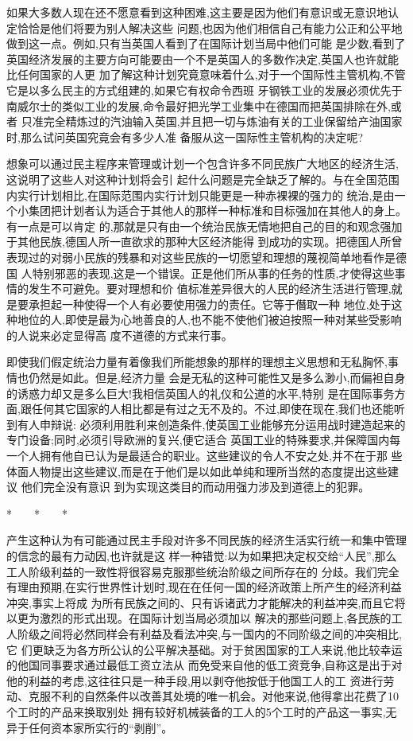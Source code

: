 ﻿\documentclass[12pt]{article}
\begin{document}
如果大多数人现在还不愿意看到这种困难,这主要是因为他们有意识或无意识地认定恰恰是他们将要为别人解决这些
问题,也因为他们相信自己有能力公正和公平地做到这一点。例如,只有当英国人看到了在国际计划当局中他们可能
是少数,看到了英国经济发展的主要方向可能要由一个不是英国人的多数作决定,英国人也许就能比任何国家的人更
加了解这种计划究竟意味着什么,对于一个国际性主管机构,不管它是以多么民主的方式组建的,如果它有权命令西班
牙钢铁工业的发展必须优先于南威尔士的类似工业的发展,命令最好把光学工业集中在德国而把英国排除在外,或者
只准完全精炼过的汽油输入英国,并且把一切与炼油有关的工业保留给产油国家时,那么试问英国究竟会有多少人准
备服从这一国际性主管机构的决定呢?

想象可以通过民主程序来管理或计划一个包含许多不同民族广大地区的经济生活,这说明了这些人对这种计划将会引
起什么问题是完全缺乏了解的。与在全国范围内实行计划相比,在国际范围内实行计划只能更是一种赤裸裸的强力的
统治,是由一个小集团把计划者认为适合于其他人的那样一种标准和目标强加在其他人的身上。有一点是可以肯定
的,那就是只有由一个统治民族无情地把自己的目的和观念强加于其他民族,德国人所一直欲求的那种大区经济能得
到成功的实现。把德国人所曾表现过的对弱小民族的残暴和对这些民族的一切愿望和理想的蔑视简单地看作是德国
人特别邪恶的表现,这是一个错误。正是他们所从事的任务的性质,才使得这些事情的发生不可避免。要对理想和价
值标准差异很大的人民的经济生活进行管理,就是要承担起一种使得一个人有必要使用强力的责任。它等于僭取一种
地位,处于这种地位的人,即使是最为心地善良的人,也不能不使他们被迫按照一种对某些受影响的人说来必定显得高
度不道德的方式来行事。

即使我们假定统治力量有着像我们所能想象的那样的理想主义思想和无私胸怀,事情也仍然是如此。但是,经济力量
会是无私的这种可能性又是多么渺小,而偏袒自身的诱惑力却又是多么巨大!我相信英国人的礼仪和公道的水平,特别
是在国际事务方面,跟任何其它国家的人相比都是有过之无不及的。不过,即使在现在,我们也还能听到有人申辩说:
必须利用胜利来创造条件,使英国工业能够充分运用战时建造起来的专门设备;同时,必须引导欧洲的复兴,便它适合
英国工业的特殊要求,并保障国内每一个人拥有他自已认为是最适合的职业。这些建议的令人不安之处,并不在于那
些体面人物提出这些建议,而是在于他们是以如此单纯和理所当然的态度提出这些建议 \myrule 他们完全没有意识
到为实现这类目的而动用强力涉及到道德上的犯罪。

*　　*　　*

产生这种认为有可能通过民主手段对许多不同民族的经济生活实行统一和集中管理的信念的最有力动因,也许就是这
样一种错觉:以为如果把决定权交给``人民'',那么工人阶级利益的一致性将很容易克服那些统治阶级之间所存在的
分歧。我们完全有理由预期,在实行世界性计划时,现在在任何一国的经济政策上所产生的经济利益冲突,事实上将成
为所有民族之间的、只有诉诸武力才能解决的利益冲突,而且它将以更为激烈的形式出现。在国际计划当局必须加以
解决的那些问题上,各民族的工人阶级之间将必然同样会有利益及看法冲突,与一国内的不同阶级之间的冲突相比,它
们更缺乏为各方所公认的公平解决基础。对于贫困国家的工人来说,他比较幸运的他国同事要求通过最低工资立法从
而免受来自他的低工资竞争,自称这是出于对他的利益的考虑,这往往只是一种手段,用以剥夺他按低于他国工人的工
资进行劳动、克服不利的自然条件以改善其处境的唯一机会。对他来说,他得拿出花费了10个工时的产品来换取别处
拥有较好机械装备的工人的5个工时的产品这一事实,无异于任何资本家所实行的``剥削''。
\end{document}
